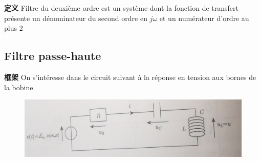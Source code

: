 \documentclass[12pt]{book}
\theoremstyle{definition}\newtheorem{dfn}{Définition}[chapter]
\theoremstyle{plain}\newtheorem{thm}{Théorème}[chapter]
\theoremstyle{plain}\newtheorem{prp}{Proposition}[chapter]
\theoremstyle{plain}\newtheorem{lem}{\bf Lemme}[chapter]
\theoremstyle{plain}\newtheorem{axm}{\bf Axiome}[chapter]
\theoremstyle{plain}\newtheorem{lmm}{\bf Lemme}[chapter]
\theoremstyle{plain}\newtheorem{cor}{\bf Corollaire}[chapter]
\theoremstyle{remark}\newtheorem{rem}{Remarque}[chapter]
\begin{document}
\begin{framed}{\textbf{定义}}
	Filtre du deuxième ordre est un système dont la fonction de transfert présente un dénominateur du second ordre en $j\omega$ et {\color{red} un numérateur d'ordre au plus 2}
\end{framed}

\subsection{Filtre passe-haute}
\begin{framed}{\textbf{框架}}
On s'intéresse dans le circuit suivant à la réponse en tension aux bornes de la bobine.
\end{framed}
\begin{figure}[H]
	\centering
	\includegraphics[scale=0.16]{Filtrage//5}
\end{figure}
\end{document}
